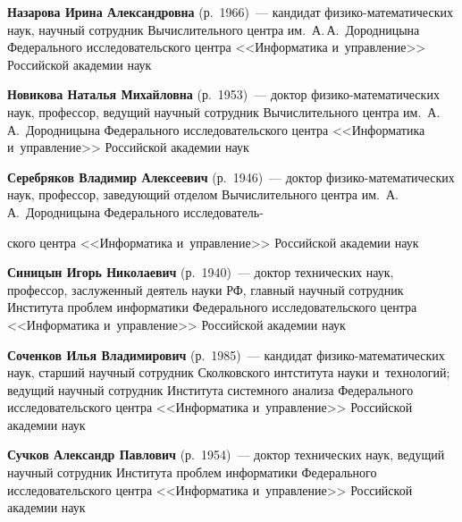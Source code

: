 \begin{multicols}{2}
\vspace*{3pt}

\noindent
\textbf{Назарова Ирина Александровна} (р.\ 1966)~--- 
кандидат фи\-зи\-ко-ма\-те\-ма\-ти\-че\-ских наук, научный сотрудник 
Вычислительного центра им.\ А.\,А.~Дородницына Федерального исследовательского 
центра <<Информатика и~управ\-ле\-ние>> Российской академии наук

\vspace*{3pt}

\noindent
\textbf{Новикова Наталья Михайловна} (р.\ 1953)~--- 
доктор фи\-зи\-ко-ма\-те\-ма\-ти\-че\-ских наук, профессор, 
ведущий научный сотрудник Вычислительного центра им.\ А.\,А.~Дородницына 
Федерального исследовательского центра <<Информатика и~управ\-ле\-ние>> 
Российской академии наук

\vspace*{3pt}

\noindent
\textbf{Серебряков Владимир Алексеевич} (р.\ 1946)~--- 
доктор фи\-зи\-ко-ма\-те\-ма\-ти\-че\-ских наук, 
профессор, за\-ве\-ду\-ющий отделом Вычислительного центра им.\ А.\,А.~Дородницына 
Федерального исследователь-\linebreak\vspace*{-12pt}

\pagebreak

\noindent
ского центра <<Информатика и~управ\-ле\-ние>>
 Российской академии наук

\vspace*{3pt}

\noindent
\textbf{Синицын Игорь Николаевич} (р.\ 1940)~--- 
доктор технических наук, профессор, заслуженный деятель науки РФ, 
главный научный сотрудник Института проб\-лем информатики Федерального 
исследовательского центра <<Информатика и~управ\-ле\-ние>> Российской академии наук

\vspace*{3pt}

\noindent
\textbf{Соченков Илья Владимирович} (р.\ 1985)~--- 
кандидат фи\-зи\-ко-ма\-те\-ма\-ти\-че\-ских наук, 
старший научный со\-труд\-ник Сколковского интститута науки и~технологий;
ведущий научный 
  со\-труд\-ник Института сис\-тем\-но\-го анализа Федерального исследовательского центра 
  <<Информатика и~управ\-ле\-ние>> Российской академии наук

\vspace*{3pt}

\noindent
\textbf{Сучков Александр Павлович} (р.\ 1954)~--- доктор технических наук, 
ведущий научный сотрудник Институ\-та проб\-лем информатики 
Федерального исследовательского центра 
<<Информатика и~управ\-ле\-ние>> Российской академии наук


\end{multicols}
